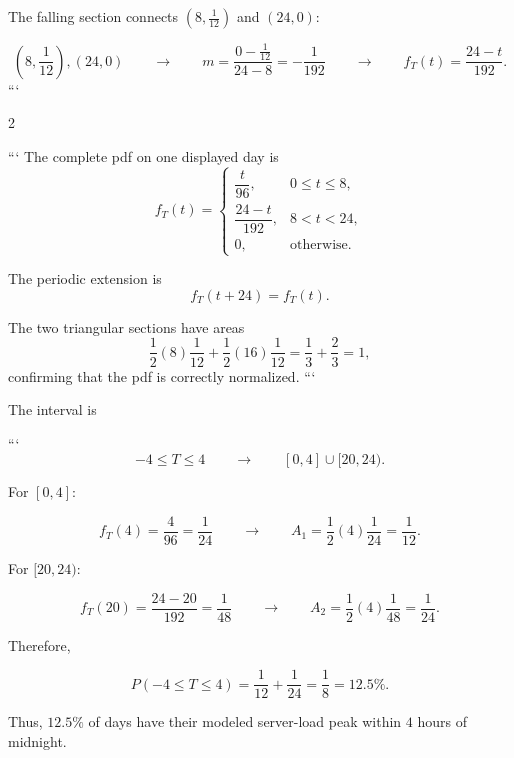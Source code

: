 	The falling section connects
	$\left(8,\frac1{12}\right)$ and $(24,0)$:
	
	$$
	\left(8,\frac1{12}\right),(24,0)
	\qquad\longrightarrow\qquad
	m=\frac{0-\frac1{12}}{24-8}
	=-\frac1{192}
	\qquad\longrightarrow\qquad
	f_T(t)=\frac{24-t}{192}.
	$$
	```
	
	\setlength{\columnseprule}{0.4pt}
	\begin{multicols}{2}
		
		```
		The complete pdf on one displayed day is
		\[
		f_T(t)=
		\begin{cases}
			\dfrac{t}{96},&0\le t\le8,\\[2mm]
			\dfrac{24-t}{192},&8<t<24,\\[2mm]
			0,&\text{otherwise}.
		\end{cases}
		\]
		
		\columnbreak
		
		The periodic extension is
		\[
		f_T(t+24)=f_T(t).
		\]
		
		The two triangular sections have areas
		\[
		\frac12(8)\frac1{12}
		+
		\frac12(16)\frac1{12}
		=
		\frac13+\frac23
		=1,
		\]
		confirming that the pdf is correctly normalized.
		```
		
	\end{multicols}
	\setlength{\columnseprule}{0pt}
	
	The interval is
	
	```
	$$
	-4\le T\le4
	\qquad\longrightarrow\qquad
	[0,4]\cup[20,24).
	$$
	
	For $[0,4]$:
	
	$$
	f_T(4)=\frac4{96}=\frac1{24}
	\qquad\longrightarrow\qquad
	A_1=\frac12(4)\frac1{24}
	=\frac1{12}.
	$$
	
	For $[20,24)$:
	
	$$
	f_T(20)=\frac{24-20}{192}
	=\frac1{48}
	\qquad\longrightarrow\qquad
	A_2=\frac12(4)\frac1{48}
	=\frac1{24}.
	$$
	
	Therefore,
	
	$$
	P(-4\le T\le4)
	=
	\frac1{12}+\frac1{24}
	=
	\frac18
	=
	12.5\%.
	$$
	
	Thus, $12.5\%$ of days have their modeled server-load peak within
	$4$ hours of midnight.
	
	

